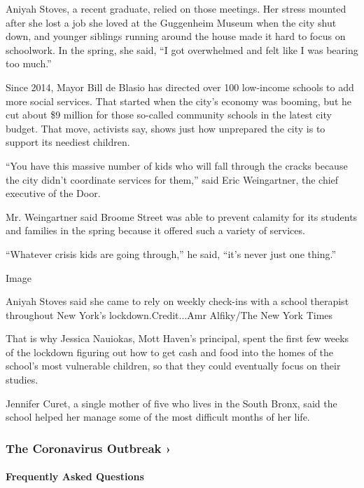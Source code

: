 Aniyah Stoves, a recent graduate, relied on those meetings. Her stress
mounted after she lost a job she loved at the Guggenheim Museum when the
city shut down, and younger siblings running around the house made it
hard to focus on schoolwork. In the spring, she said, ``I got
overwhelmed and felt like I was bearing too much.''

Since 2014, Mayor Bill de Blasio has directed over 100 low-income
schools to add more social services. That started when the city's
economy was booming, but he cut about \$9 million for those so-called
community schools in the latest city budget. That move, activists say,
shows just how unprepared the city is to support its neediest children.

``You have this massive number of kids who will fall through the cracks
because the city didn't coordinate services for them,'' said Eric
Weingartner, the chief executive of the Door.

Mr. Weingartner said Broome Street was able to prevent calamity for its
students and families in the spring because it offered such a variety of
services.

``Whatever crisis kids are going through,'' he said, ``it's never just
one thing.''

Image

Aniyah Stoves said she came to rely on weekly check-ins with a school
therapist throughout New York's lockdown.Credit...Amr Alfiky/The New
York Times

That is why Jessica Nauiokas, Mott Haven's principal, spent the first
few weeks of the lockdown figuring out how to get cash and food into the
homes of the school's most vulnerable children, so that they could
eventually focus on their studies.

Jennifer Curet, a single mother of five who lives in the South Bronx,
said the school helped her manage some of the most difficult months of
her life.

\href{https://www.nytimes3xbfgragh.onion/news-event/coronavirus?action=click\&pgtype=Article\&state=default\&region=MAIN_CONTENT_3\&context=storylines_faq}{}

\hypertarget{the-coronavirus-outbreak-}{%
\subsubsection{The Coronavirus Outbreak
›}\label{the-coronavirus-outbreak-}}

\hypertarget{frequently-asked-questions}{%
\paragraph{Frequently Asked
Questions}\label{frequently-asked-questions}}

